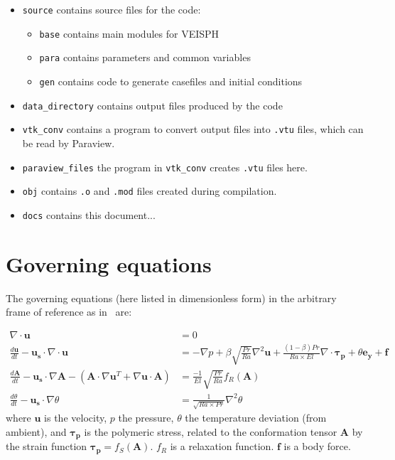 \documentclass[notitlepage]{revtex4-2}
\begin{document}
\begin{itemize}
\item \verb|source| contains source files for the code:
\begin{itemize}
\item \verb|base| contains main modules for VEISPH
\item \verb|para| contains parameters and common variables
\item \verb|gen| contains code to generate casefiles and initial conditions
\end{itemize}
\item \verb|data_directory| contains output files produced by the code
\item \verb|vtk_conv| contains a program to convert output files into \verb|.vtu| files, which can be read by Paraview.
\item \verb|paraview_files| the program in \verb|vtk_conv| creates \verb|.vtu| files here.
\item \verb|obj| contains \verb|.o| and \verb|.mod| files created during compilation.
\item \verb|docs| contains this document...
\end{itemize}  


\section{Governing equations}\label{ge}

The governing equations (here listed in dimensionless form) in the arbitrary frame of reference as in~\cite{king_2020_ve} are:

\begin{subequations}
\begin{align}\nabla\cdot\bm{u}&=0\label{eq:mass}\\
\frac{d\bm{u}}{dt}-\bm{u_{s}}\cdot\nabla\cdot\bm{u}&=-\nabla{p}+\beta\sqrt{\frac{Pr}{Ra}}\nabla^{2}\bm{u}+\frac{\left(1-\beta\right)Pr}{Ra\times{El}}\nabla\cdot\bm{\tau_{p}}+\theta\bm{e_{y}}+\bm{f}\label{eq:mom}\\
\frac{d\bm{A}}{dt}-\bm{u_{s}}\cdot\nabla\bm{A}-\left(\bm{A}\cdot\nabla\bm{u}^{T}+\nabla\bm{u}\cdot\bm{A}\right)&=\frac{-1}{El}\sqrt{\frac{Pr}{Ra}}f_{R}\left(\bm{A}\right)\label{eq:conf}\\
\frac{d\theta}{dt}-\bm{u_{s}}\cdot\nabla\theta&=\frac{1}{\sqrt{Ra\times{Pr}}}\nabla^{2}\theta\label{eq:heat}\end{align}\label{eq:ce}\end{subequations}
where $\bm{u}$ is the velocity, $p$ the pressure, $\theta$ the temperature deviation (from ambient), and $\bm{\tau_{p}}$ is the polymeric stress, related to the conformation tensor $\bm{A}$ by  the strain function $\bm{\tau_{p}}=f_{S}\left(\bm{A}\right)$. $f_{R}$ is a relaxation function. $\bm{f}$ is a body force.
\end{document}
